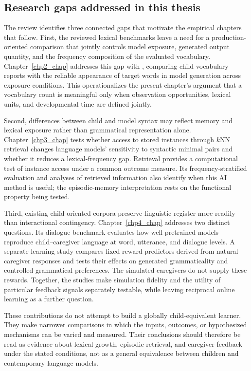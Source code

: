 \subsection{Research gaps addressed in this thesis}
\label{sec:litreview:thesis-gaps}

The review identifies three connected gaps that motivate the empirical chapters that follow. First, the reviewed lexical benchmarks leave a need for a production-oriented comparison that jointly controls model exposure, generated output quantity, and the frequency composition of the evaluated vocabulary. Chapter~\ref{chp2_chap} addresses this gap with \meCDI{}, comparing child vocabulary reports with the reliable appearance of target words in model generation across exposure conditions. This operationalizes the present chapter's argument that a vocabulary count is meaningful only when observation opportunities, lexical units, and developmental time are defined jointly.

Second, differences between child and model syntax may reflect memory and lexical exposure rather than grammatical representation alone. Chapter~\ref{chp3_chap} tests whether access to stored instances through $k$NN retrieval changes language models' sensitivity to syntactic minimal pairs and whether it reduces a lexical-frequency gap. Retrieval provides a computational test of instance access under a common outcome measure. Its frequency-stratified evaluation and analyses of retrieved information also identify when this AI method is useful; the episodic-memory interpretation rests on the functional property being tested.

Third, existing child-oriented corpora preserve linguistic register more readily than interactional contingency. Chapter~\ref{chp4_chap} addresses two distinct questions. Its dialogue benchmark evaluates how well pretrained models reproduce child--caregiver language at word, utterance, and dialogue levels. A separate learning study compares fixed reward predictors derived from natural caregiver responses and tests their effects on generated grammaticality and controlled grammatical preferences. The simulated caregivers do not supply these rewards. Together, the studies make simulation fidelity and the utility of particular feedback signals separately testable, while leaving reciprocal online learning as a further question.

These contributions do not attempt to build a globally child-equivalent learner. They make narrower comparisons in which the inputs, outcomes, or hypothesized mechanisms can be varied and measured. Their conclusions should therefore be read as evidence about lexical growth, episodic retrieval, and caregiver feedback under the stated conditions, not as a general equivalence between children and contemporary language models.

